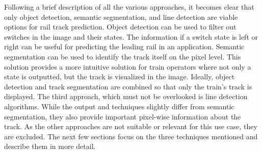 \vspace{2cm} %

\noindent Following a brief description of all the various approaches, it becomes clear that only object detection, semantic segmentation, and line detection are viable options for rail track prediction.
Object detection can be used to filter out switches in the image and their states.
The information if a switch state is left or right can be useful for predicting the leading rail in an application.
Semantic segmentation can be used to identify the track itself on the pixel level.
This solution provides a more intuitive solution for train operators where not only a state is outputted, but the track is visualized in the image.
Ideally, object detection and track segmentation are combined so that only the train's track is displayed.
The third approach, which must not be overlooked is line detection algorithms.
While the output and techniques slightly differ from semantic segmentation, they also provide important pixel-wise information about the track.
As the other approaches are not suitable or relevant for this use case, they are excluded. The next few sections focus on the three techniques mentioned and describe them in more detail.